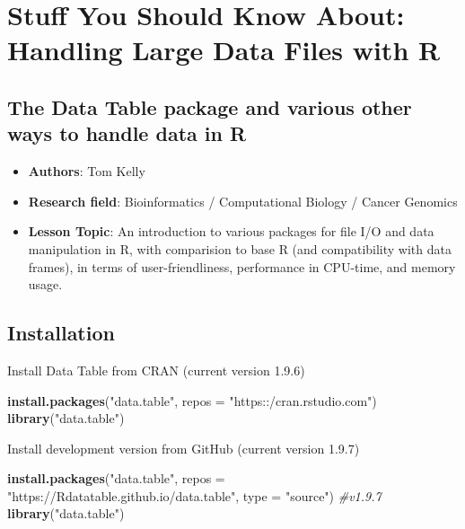 \documentclass[]{article}
\title{}
\author{}
\date{}
\newenvironment{Shaded}{\begin{snugshade}}{\end{snugshade}}
\newcommand{\KeywordTok}[1]{\textcolor[rgb]{0.13,0.29,0.53}{\textbf{{#1}}}}
\newcommand{\DataTypeTok}[1]{\textcolor[rgb]{0.13,0.29,0.53}{{#1}}}
\newcommand{\StringTok}[1]{\textcolor[rgb]{0.31,0.60,0.02}{{#1}}}
\newcommand{\CommentTok}[1]{\textcolor[rgb]{0.56,0.35,0.01}{\textit{{#1}}}}
\newcommand{\NormalTok}[1]{{#1}}
\providecommand{\tightlist}{%
  \setlength{\itemsep}{0pt}\setlength{\parskip}{0pt}}
\begin{document}
\maketitle

\section{Stuff You Should Know About: Handling Large Data Files with
R}\label{stuff-you-should-know-about-handling-large-data-files-with-r}

\subsection{The Data Table package and various other ways to handle data
in
R}\label{the-data-table-package-and-various-other-ways-to-handle-data-in-r}

\begin{itemize}
\tightlist
\item
  \textbf{Authors}: Tom Kelly
\item
  \textbf{Research field}: Bioinformatics / Computational Biology /
  Cancer Genomics
\item
  \textbf{Lesson Topic}: An introduction to various packages for file
  I/O and data manipulation in R, with comparision to base R (and
  compatibility with data frames), in terms of user-friendliness,
  performance in CPU-time, and memory usage.
\end{itemize}

\subsection{Installation}\label{installation}

Install Data Table from CRAN (current version 1.9.6)

\begin{Shaded}
\begin{Highlighting}[]
\KeywordTok{install.packages}\NormalTok{(}\StringTok{"data.table"}\NormalTok{, }\DataTypeTok{repos =} \StringTok{"https::/cran.rstudio.com"}\NormalTok{)}
\KeywordTok{library}\NormalTok{(}\StringTok{"data.table"}\NormalTok{)}
\end{Highlighting}
\end{Shaded}

Install development version from GitHub (current version 1.9.7)

\begin{Shaded}
\begin{Highlighting}[]
\KeywordTok{install.packages}\NormalTok{(}\StringTok{"data.table"}\NormalTok{, }\DataTypeTok{repos =} \StringTok{"https://Rdatatable.github.io/data.table"}\NormalTok{, }\DataTypeTok{type =} \StringTok{"source"}\NormalTok{) }\CommentTok{#v1.9.7}
\KeywordTok{library}\NormalTok{(}\StringTok{"data.table"}\NormalTok{)}
\end{Highlighting}
\end{Shaded}
\end{document}
